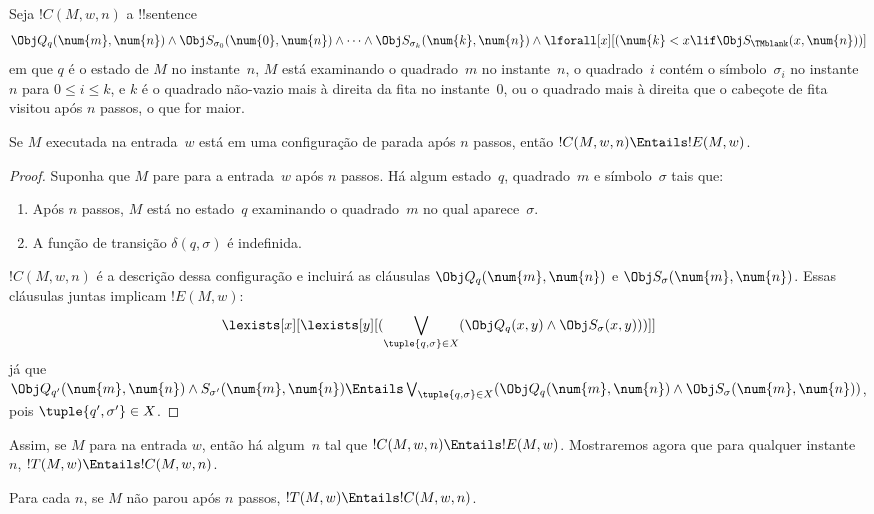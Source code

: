 \documentclass[../../../include/open-logic-section]{subfiles}
\begin{document}
\begin{defn} 
Seja $!C(M, w, n)$ a !!{sentence}
\[ 
\Obj Q_q(\num{m}, \num{n}) \land \Obj S_{\sigma_0}(\num{0}, \num{n})
\land \dots \land \Obj S_{\sigma_k}(\num{k}, \num{n}) \land
\lforall[x][(\num{k} < x \lif \Obj S_\TMblank(x, \num{n}))]
\] 
em que $q$ é o estado de $M$ no instante~$n$, $M$ está examinando o
quadrado~$m$ no instante~$n$, o quadrado~$i$ contém o símbolo~$\sigma_i$
no instante~$n$ para $0 \le i \le k$, e $k$ é o quadrado não-vazio
mais à direita da fita no instante~$0$, ou o quadrado mais à direita
que o cabeçote de fita visitou após $n$ passos, o que for maior.
\end{defn}

\begin{lem}
Se $M$ executada na entrada~$w$ está em uma configuração de parada após
$n$ passos, então $!C(M, w, n) \Entails !E(M, w)$.
\end{lem}

\begin{proof}
Suponha que $M$ pare para a entrada~$w$ após $n$ passos.
Há algum estado~$q$, quadrado~$m$ e símbolo~$\sigma$ tais que:
\begin{enumerate} 
\item Após $n$ passos, $M$ está no estado~$q$ examinando o
  quadrado~$m$ no qual aparece~$\sigma$.
\item A função de transição $\delta(q, \sigma)$ é indefinida.
\end{enumerate}
$!C(M, w, n)$ é a descrição dessa configuração e incluirá as cláusulas
$\Obj Q_{q}(\num{m}, \num{n})$ e $\Obj S_{\sigma}(\num{m}, \num{n})$.
Essas cláusulas juntas implicam $!E(M, w)$:
\[
\lexists[x][\lexists[y][(\bigvee_{\tuple{q, \sigma} \in
      X}(\Obj Q_q(x, y) \land \Obj S_\sigma(x, y)))]]
\]
já que $\Obj Q_{q'}(\num{m}, \num{n}) \land S_{\sigma'}(\num{m},
\num{n}) \Entails \bigvee_{\tuple{q, \sigma} \in X} (\Obj Q_q(\num{m},
\num{n}) \land \Obj S_{\sigma}(\num{m}, \num{n}))$, pois
$\tuple{q',\sigma'} \in X$. 
\end{proof}

\begin{explain}
Assim, se $M$ para na entrada $w$, então há algum~$n$ tal que $!C(M,
w, n) \Entails !E(M,w)$.  Mostraremos agora que para qualquer
instante~$n$, $!T(M, w) \Entails !C(M, w, n)$.
\end{explain}

\begin{lem}
Para cada $n$, se $M$ não parou após $n$ passos, $!T(M, w)
\Entails !C(M, w, n)$.
\end{lem}
\end{document}
